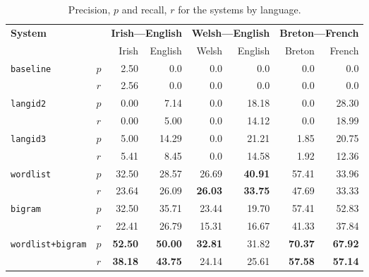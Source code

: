 \documentclass[11pt]{article}
\begin{document}
\begin{table}
\begin{center}
\begin{tabular}{|lc|r|r|r|r|r|r|}
\hline
\multirow{2}{*}{\textbf{System}}            & & \multicolumn{2}{c}{\textbf{Irish---English}} & \multicolumn{2}{|c|}{\textbf{Welsh---English}} & \multicolumn{2}{c|}{\textbf{Breton---French}}  \\\cline{3-8}
                                          &      &  Irish &  English & Welsh  & English & Breton & French \\
\hline 
\multirow{2}{*}{\texttt{baseline}}        &  $p$ &  2.50   & 0.0      & 0.0   & 0.0 & 0.0 & 0.0 \\
                                          & $r$  & 2.56    & 0.0      & 0.0   & 0.0 & 0.0 & 0.0 \\
\hline
\multirow{2}{*}{\texttt{langid2}}         &  $p$ &  0.00   & 7.14     & 0.0   & 18.18    & 0.0 & 28.30 \\
                                          & $r$  & 0.00    & 5.00     & 0.0   & 14.12 & 0.0 & 18.99 \\
\hline
\multirow{2}{*}{\texttt{langid3}}         &  $p$ &  5.00   & 14.29    & 0.0   & 21.21 & 1.85 & 20.75 \\
                                          & $r$  & 5.41    & 8.45     & 0.0   & 14.58 & 1.92 & 12.36 \\
\hline
\multirow{2}{*}{\texttt{wordlist}}        &  $p$ &  32.50 & 28.57     & 26.69 & {\bf 40.91} & 57.41 & 33.96 \\
                                          & $r$  & 23.64  & 26.09     & {\bf 26.03} & {\bf 33.75} & 47.69 & 33.33 \\
\hline
\multirow{2}{*}{\texttt{bigram}}          &  $p$ &  32.50   & 35.71   & 23.44 & 19.70  & 57.41 & 52.83 \\
                                          & $r$  & 22.41    & 26.79   & 15.31 & 16.67 & 41.33 & 37.84 \\
\hline
\multirow{2}{*}{\texttt{wordlist+bigram}} &  $p$ &  {\bf 52.50}   & {\bf 50.00}   & {\bf 32.81} & 31.82 & {\bf 70.37} & {\bf 67.92} \\
                                          & $r$  & {\bf 38.18}    & {\bf 43.75}   & 24.14 & 25.61 & {\bf 57.58} & {\bf 57.14} \\
\hline
\end{tabular}
\end{center}
\label{table:precisionrecall}
\caption{Precision, $p$ and recall, $r$ for the systems by language.}

\end{table}
\end{document}
